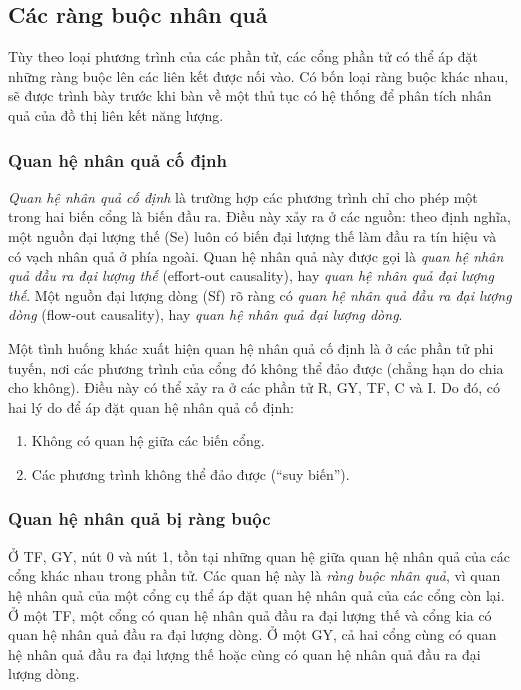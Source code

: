 \subsection{Các ràng buộc nhân quả}
Tùy theo loại phương trình của các phần tử, các cổng phần tử có thể áp đặt những ràng buộc lên các liên kết được nối vào. Có bốn loại ràng buộc khác nhau, sẽ được trình bày trước khi bàn về một thủ tục có hệ thống để phân tích nhân quả của đồ thị liên kết năng lượng.

\subsubsection{Quan hệ nhân quả cố định}
\emph{Quan hệ nhân quả cố định} là trường hợp các phương trình chỉ cho phép một trong hai biến cổng là biến đầu ra. Điều này xảy ra ở các nguồn: theo định nghĩa, một nguồn đại lượng thế (Se) luôn có biến đại lượng thế làm đầu ra tín hiệu và có vạch nhân quả ở phía ngoài. Quan hệ nhân quả này được gọi là \emph{quan hệ nhân quả đầu ra đại lượng thế} (effort-out causality), hay \emph{quan hệ nhân quả đại lượng thế}. Một nguồn đại lượng dòng (Sf) rõ ràng có \emph{quan hệ nhân quả đầu ra đại lượng dòng} (flow-out causality), hay \emph{quan hệ nhân quả đại lượng dòng}.

Một tình huống khác xuất hiện quan hệ nhân quả cố định là ở các phần tử phi tuyến, nơi các phương trình của cổng đó không thể đảo được (chẳng hạn do chia cho không). Điều này có thể xảy ra ở các phần tử R, GY, TF, C và I. Do đó, có hai lý do để áp đặt quan hệ nhân quả cố định:
\begin{enumerate}
\item Không có quan hệ giữa các biến cổng.
\item Các phương trình không thể đảo được (``suy biến'').
\end{enumerate}

\subsubsection{Quan hệ nhân quả bị ràng buộc}
Ở TF, GY, nút 0 và nút 1, tồn tại những quan hệ giữa quan hệ nhân quả của các cổng khác nhau trong phần tử. Các quan hệ này là \emph{ràng buộc nhân quả}, vì quan hệ nhân quả của một cổng cụ thể áp đặt quan hệ nhân quả của các cổng còn lại. Ở một TF, một cổng có quan hệ nhân quả đầu ra đại lượng thế và cổng kia có quan hệ nhân quả đầu ra đại lượng dòng. Ở một GY, cả hai cổng cùng có quan hệ nhân quả đầu ra đại lượng thế hoặc cùng có quan hệ nhân quả đầu ra đại lượng dòng.

